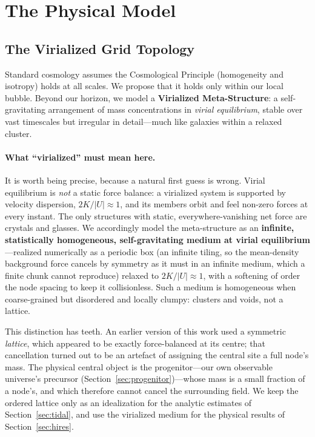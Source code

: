 \documentclass{article}
\begin{document}
\section{The Physical Model}
\label{sec:model}

\subsection{The Virialized Grid Topology}
\label{sec:grid}
Standard cosmology assumes the Cosmological Principle (homogeneity and isotropy) holds at all scales.
We propose that it holds only within our local bubble.
Beyond our horizon, we model a \textbf{Virialized Meta-Structure}: a self-gravitating arrangement of mass concentrations in \emph{virial equilibrium}, stable over vast timescales but irregular in detail—much like galaxies within a relaxed cluster.

\paragraph{What ``virialized'' must mean here.} It is worth being precise, because a natural first guess is wrong. Virial equilibrium is \emph{not} a static force balance: a virialized system is supported by velocity dispersion, $2K/|U| \approx 1$, and its members orbit and feel non-zero forces at every instant. The only structures with static, everywhere-vanishing net force are crystals and glasses. We accordingly model the meta-structure as an \textbf{infinite, statistically homogeneous, self-gravitating medium at virial equilibrium}---realized numerically as a periodic box (an infinite tiling, so the mean-density background force cancels by symmetry as it must in an infinite medium, which a finite chunk cannot reproduce) relaxed to $2K/|U|\approx1$, with a softening of order the node spacing to keep it collisionless. Such a medium is homogeneous when coarse-grained but disordered and locally clumpy: clusters and voids, not a lattice.

This distinction has teeth. An earlier version of this work used a symmetric \emph{lattice}, which appeared to be exactly force-balanced at its centre; that cancellation turned out to be an artefact of assigning the central site a full node's mass. The physical central object is the progenitor---our own observable universe's precursor (Section~\ref{sec:progenitor})---whose mass is a small fraction of a node's, and which therefore cannot cancel the surrounding field. We keep the ordered lattice only as an idealization for the analytic estimates of Section~\ref{sec:tidal}, and use the virialized medium for the physical results of Section~\ref{sec:hires}.
\end{document}
